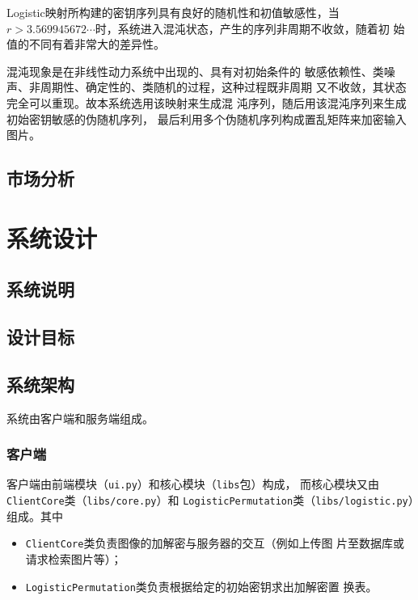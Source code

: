 \documentclass[12pt, titlepage]{ctexrep}
\begin{document}
Logistic映射所构建的密钥序列具有良好的随机性和初值敏感性，当$r >
3.569945672\dotsb$时，系统进入混沌状态，产生的序列非周期不收敛，随着初
始值的不同有着非常大的差异性\cite{yang2011}。

混沌现象是在非线性动力系统中出现的、具有对初始条件的
敏感依赖性、类噪声、非周期性、确定性的、类随机的过程，这种过程既非周期
又不收敛，其状态完全可以重现\cite{lu2007}。故本系统选用该映射来生成混
沌序列，随后用该混沌序列来生成初始密钥敏感的伪随机序列，
最后利用多个伪随机序列构成置乱矩阵来加密输入图片。

\section{市场分析}
\label{sec:market-analysis}



\chapter{系统设计}
\label{chap:sys-design}

\section{系统说明}
\label{sec:sys-description}

\section{设计目标}
\label{sec:design-goal}

\section{系统架构}
\label{sec:sys-arch}

系统由客户端和服务端组成。

\subsection{客户端}
客户端由前端模块（\texttt{ui.py}）和核心模块（\texttt{libs}包）构成，
而核心模块又由\texttt{ClientCore}类（\texttt{libs/core.py}）和
\texttt{LogisticPermutation}类（\texttt{libs/logistic.py}）组成。其中
\begin{itemize}
\item \texttt{ClientCore}类负责图像的加解密与服务器的交互（例如上传图
  片至数据库或请求检索图片等）；
\item \texttt{LogisticPermutation}类负责根据给定的初始密钥求出加解密置
  换表。
\end{itemize}
\end{document}

